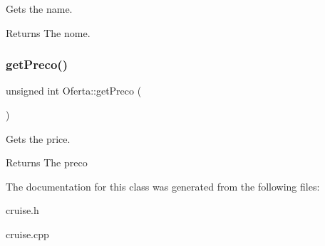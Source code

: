 Gets the name. 

\begin{DoxyReturn}{Returns}
The nome. 
\end{DoxyReturn}
\mbox{\label{classOferta_a6237afc2e8a33fb55b1ef0decf9d9aaa}} 
\subsubsection{\texorpdfstring{get\+Preco()}{getPreco()}}
{\footnotesize\ttfamily unsigned int Oferta\+::get\+Preco (\begin{DoxyParamCaption}{ }\end{DoxyParamCaption})\hspace{0.3cm}{\ttfamily [inline]}}



Gets the price. 

\begin{DoxyReturn}{Returns}
The preco 
\end{DoxyReturn}


The documentation for this class was generated from the following files\+:\begin{DoxyCompactItemize}
\item 
cruise.\+h\item 
cruise.\+cpp\end{DoxyCompactItemize}

